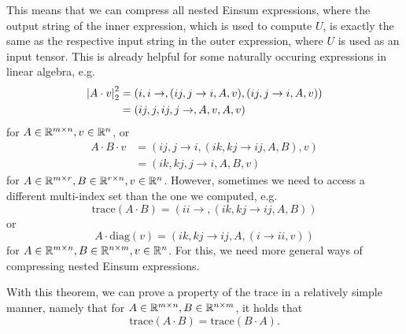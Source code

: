 This means that we can compress all nested Einsum expressions, where the output string of the inner expression, which is used to compute $U$, is exactly the same as the respective input string in the outer expression, where $U$ is used as an input tensor.
This is already helpful for some naturally occuring expressions in linear algebra, e.g.
\begin{align*}
    \left| A \cdot v \right|_2^2 & = (i,i\rightarrow,(ij, j \rightarrow i, A, v),(ij, j \rightarrow i, A, v)) \\
                        & = (ij,j,ij,j\rightarrow,A,v,A,v)
\end{align*}
for $A \in \mathbb{R}^{m \times n}, v \in \mathbb{R}^{n}$, or
\begin{align*}
    A \cdot B \cdot v & = (ij, j \rightarrow i, (ik, kj \rightarrow ij, A, B), v) \\
                      & = (ik,kj,j \rightarrow i, A, B, v)
\end{align*}
for $A \in \mathbb{R}^{m \times r}, B \in \mathbb{R}^{r \times n}, v \in \mathbb{R}^n$.
However, sometimes we need to access a different multi-index set than the one we computed, e.g.
$$\text{trace}(A \cdot B) = (ii \rightarrow, (ik, kj \rightarrow ij, A, B))$$
or
$$A \cdot \text{diag}(v) = (ik, kj \rightarrow ij, A, (i \rightarrow ii, v))$$
for $A \in \mathbb{R}^{m \times n}, B \in \mathbb{R}^{n \times m}, v \in \mathbb{R}^{n}$.
For this, we need more general ways of compressing nested Einsum expressions.



With this theorem, we can prove a property of the trace in a relatively simple manner, namely that for $A \in \mathbb{R}^{m \times n}, B \in \mathbb{R}^{n \times m}$,
it holds that
$$\text{trace}(A \cdot B) = \text{trace}(B \cdot A).$$

